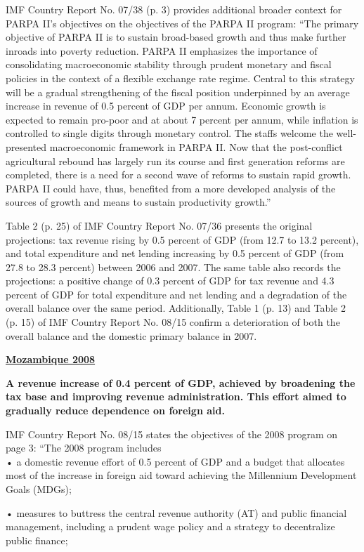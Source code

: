 IMF Country Report No. 07/38 (p. 3) provides additional broader context for PARPA II’s objectives on the objectives of the PARPA II program: “The primary objective of PARPA II is to sustain broad-based growth and thus make further inroads into poverty reduction. PARPA II emphasizes the importance of consolidating macroeconomic stability through prudent monetary and fiscal policies in the context of a flexible exchange rate regime. Central to this strategy will be a gradual strengthening of the fiscal position underpinned by an average increase in revenue of 0.5 percent of GDP per annum. Economic growth is expected to remain pro-poor and at about 7 percent per annum, while inflation is controlled to single digits through monetary control. The staffs welcome the well-presented macroeconomic framework in PARPA II. Now that the post-conflict agricultural rebound has largely run its course and first generation reforms are completed, there is a need for a second wave of reforms to sustain rapid growth. PARPA II could have, thus, benefited from a more developed analysis of the sources of growth and means to sustain productivity growth.”

Table 2 (p. 25) of IMF Country Report No. 07/36 presents the original projections: tax revenue rising by 0.5 percent of GDP (from 12.7 to 13.2 percent), and total expenditure and net lending increasing by 0.5 percent of GDP (from 27.8 to 28.3 percent) between 2006 and 2007. The same table also records the projections: a positive change of 0.3 percent of GDP for tax revenue and 4.3 percent of GDP for total expenditure and net lending and a degradation of the overall balance over the same period. Additionally, Table 1 (p. 13) and Table 2 (p. 15) of IMF Country Report No. 08/15 confirm a deterioration of both the overall balance and the domestic primary balance in 2007.

\textbf{\underline{Mozambique 2008}}

\textbf{A revenue increase of 0.4 percent of GDP, achieved by broadening the tax base and improving revenue administration. This effort aimed to gradually reduce dependence on foreign aid.}

IMF Country Report No. 08/15 states the objectives of the 2008 program on page 3: “The 2008 program includes\\
• a domestic revenue effort of 0.5 percent of GDP and a budget that allocates most of the increase in foreign aid toward achieving the Millennium Development Goals (MDGs);

• measures to buttress the central revenue authority (AT) and public financial management, including a prudent wage policy and a strategy to decentralize public finance;

